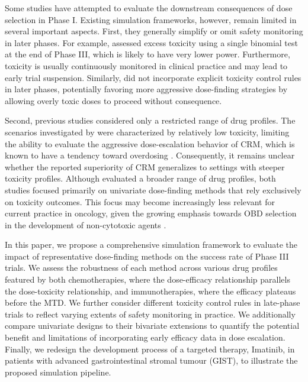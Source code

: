 \documentclass[11pt]{article}
\begin{document}
Some studies have attempted to evaluate the downstream consequences of dose selection in Phase I. Existing simulation frameworks, however, remain limited in several important aspects. First, they generally simplify or omit safety monitoring in later phases. For example, \textcite{conaway2019impact} assessed excess toxicity using a single binomial test at the end of Phase III, which is likely to have very lower power. Furthermore, toxicity is usually continuously monitored in clinical practice and may lead to early trial suspension. Similarly, \textcite{ruppert2018overall} did not incorporate explicit toxicity control rules in later phases, potentially favoring more aggressive dose-finding strategies by allowing overly toxic doses to proceed without consequence.

Second, previous studies considered only a restricted range of drug profiles. The scenarios investigated by \textcite{conaway2019impact} were characterized by relatively low toxicity, limiting the ability to evaluate the aggressive dose-escalation behavior of CRM, which is known to have a tendency toward overdosing \parencite{EWOC}. Consequently, it remains unclear whether the reported superiority of CRM generalizes to settings with steeper toxicity profiles. Although \textcite{ruppert2018overall} evaluated a broader range of drug profiles, both studies focused primarily on univariate dose-finding methods that rely exclusively on toxicity outcomes. This focus may become increasingly less relevant for current practice in oncology, given the growing emphasis towards OBD selection in the development of non-cytotoxic agents \parencite{araujo2023oncology}. 

In this paper, we propose a comprehensive simulation framework to evaluate the impact of representative dose-finding methods on the success rate of Phase III trials. We assess the robustness of each method across various drug profiles featured by both chemotherapies, where the dose-efficacy relationship parallels the dose-toxicity relationship, and immunotherapies, where the efficacy plateaus before the MTD. We further consider different toxicity control rules in late-phase trials to reflect varying extents of safety monitoring in practice. We additionally compare univariate designs to their bivariate extensions to quantify the potential benefit and limitations of incorporating early efficacy data in dose escalation. Finally, we redesign the development process of a targeted therapy, Imatinib, in patients with advanced gastrointestinal stromal tumour (GIST), to illustrate the proposed simulation pipeline.
\end{document}

